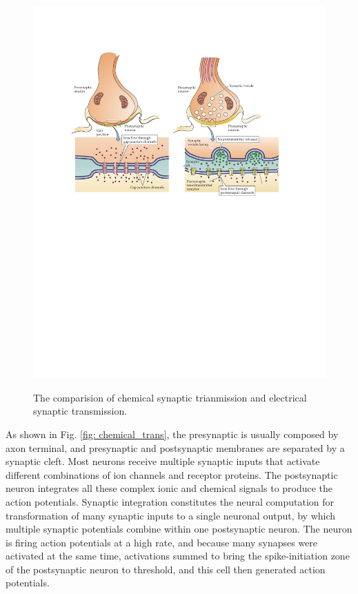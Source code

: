 \documentclass[journal,comsoc]{IEEEtran}
\begin{document}
\begin{figure}[htbp]
{\begin{minipage}[t]{0.42\linewidth}
							\includegraphics[width=0.9\linewidth]{figures/chemical_trans.pdf}	
							\label{fig: chemical_trans}
					\end{minipage}}
					\caption{The comparision of chemical synaptic trianmission and electrical synaptic transmission.}
					\label{fig: synaptic_cop}
				\end{figure}
			
				As shown in Fig. \ref{fig: chemical_trans}, the presynaptic is usually composed by axon terminal, and presynaptic and postsynaptic membranes are separated by a synaptic cleft.
				Most neurons receive multiple synaptic inputs that activate different combinations of ion channels and receptor proteins. 
				The postsynaptic neuron integrates all these complex ionic and chemical signals to produce the action potentials\cite{beanewman2003structure007neuroscience}. 
				Synaptic integration constitutes the neural computation for transformation of many synaptic inputs to a single neuronal output, by which multiple synaptic potentials combine within one postsynaptic neuron.
				The neuron is firing action potentials at a high rate, and because many synapses were activated at the same time, activations summed to bring the spike-initiation zone of the postsynaptic neuron to threshold, and this cell then generated action potentials. 
				
\end{document}
